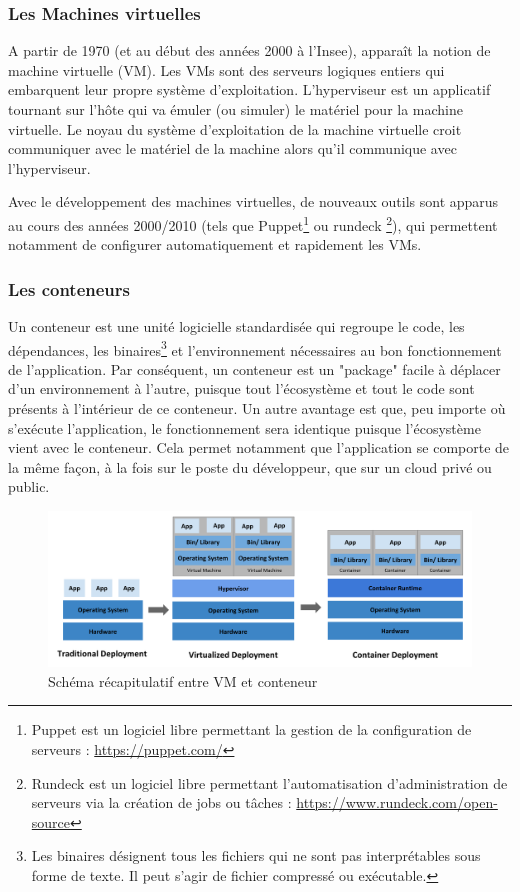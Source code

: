 \documentclass[11pt,fleqn]{book} %
\begin{document}
\subsubsection{Les Machines virtuelles}
A partir de 1970 (et au début des années 2000 à l'Insee), apparaît  la notion de machine virtuelle (VM). Les VMs sont des serveurs logiques entiers qui embarquent leur propre système d’exploitation. L’hyperviseur est un applicatif tournant sur l’hôte qui va émuler (ou simuler) le matériel pour la machine virtuelle. Le noyau du système d’exploitation de la machine virtuelle croit communiquer avec le matériel de la machine alors qu’il communique avec l’hyperviseur.

Avec le développement des machines virtuelles, de nouveaux outils sont apparus au cours des années 2000/2010 (tels que Puppet\footnote{Puppet est un logiciel libre permettant la gestion de la configuration de serveurs : \url{https://puppet.com/}} ou rundeck \footnote{Rundeck est un logiciel libre permettant l'automatisation d'administration de serveurs via la création de jobs ou tâches : \url{https://www.rundeck.com/open-source}}), qui permettent notamment de configurer automatiquement et rapidement les VMs.


\subsubsection{Les conteneurs}
Un conteneur est une unité logicielle standardisée qui regroupe le code, les dépendances, les binaires\footnote{Les binaires désignent tous les fichiers qui ne sont pas interprétables sous forme de texte. Il peut s'agir de fichier compressé ou exécutable.} et l'environnement nécessaires au bon fonctionnement de l'application. Par conséquent, un conteneur est un "package" facile à déplacer d'un environnement à l'autre, puisque tout l'écosystème et tout le code sont présents à l'intérieur de ce conteneur. Un autre avantage est que, peu importe où s'exécute l'application, le fonctionnement sera identique puisque l'écosystème vient avec le conteneur. Cela permet notamment que l'application se comporte de la même façon, à la fois sur le poste du développeur, que sur un cloud privé ou public. \\




\begin{figure}[H]\centering
\renewcommand{\figurename}{Schéma}
\includegraphics[scale=0.3]{Pictures/container_evolution.png}
\captionsetup{margin=1.5cm,format=hang,justification=justified}
\caption[]{Schéma récapitulatif entre VM et conteneur \newline}
\end{figure}
\end{document}
